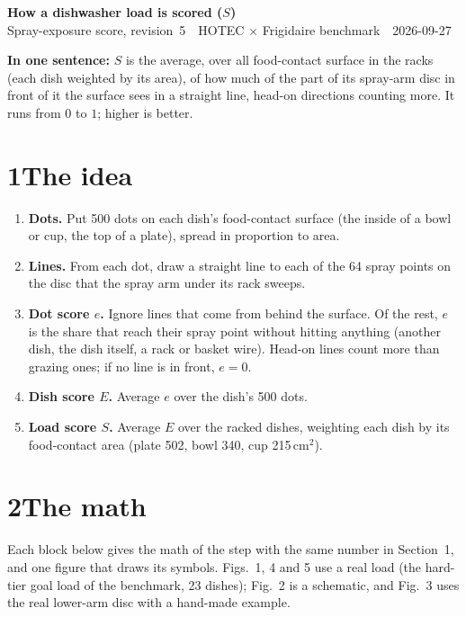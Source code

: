 \documentclass[10pt]{article}
\newif\ifpuddlerule
\begin{document}
\setlength{\abovedisplayskip}{4pt}\setlength{\belowdisplayskip}{4pt}
\setlength{\abovedisplayshortskip}{2pt}\setlength{\belowdisplayshortskip}{2pt}

{\LARGE\bfseries How a dishwasher load is scored ($S$)}\\[3pt]
{\small Spray-exposure score, revision~5 \,\textperiodcentered\, HOTEC $\times$ Frigidaire benchmark \,\textperiodcentered\, 2026-09-27}

\medskip
\textbf{In one sentence:} $S$ is the average, over all food-contact surface in the racks (each dish weighted by its area), of how much of the part of its spray-arm disc in front of it the surface sees in a straight line, head-on directions counting more.
It runs from $0$ to $1$; higher is better.

\section*{1\quad The idea}
\begin{enumerate}
\item \textbf{Dots.} Put 500 dots on each dish's food-contact surface (the inside of a bowl or cup, the top of a plate), spread in proportion to area.
\item \textbf{Lines.} From each dot, draw a straight line to each of the 64 spray points on the disc that the spray arm under its rack sweeps.
\item \textbf{Dot score $e$.} Ignore lines that come from behind the surface. Of the rest, $e$ is the share that reach their spray point without hitting anything (another dish, the dish itself, a rack or basket wire). Head-on lines count more than grazing ones; if no line is in front, $e=0$.
\item \textbf{Dish score $E$.} Average $e$ over the dish's 500 dots.
\item \textbf{Load score $S$.} Average $E$ over the racked dishes, weighting each dish by its food-contact area (plate 502, bowl 340, cup 215\,cm$^2$).
\end{enumerate}
\ifpuddlerule
A load in which any plate, bowl or cup would hold a puddle is \emph{infeasible}, whatever its $S$.
\fi

\small
\setlength{\abovedisplayskip}{3pt}\setlength{\belowdisplayskip}{3pt}
\section*{2\quad The math}
Each block below gives the math of the step with the same number in Section~1, and one figure that draws its symbols. Figs.~1, 4 and 5 use a real load (the hard-tier goal load of the benchmark, 23 dishes); Fig.~2 is a schematic, and Fig.~3 uses the real lower-arm disc with a hand-made example.
\end{document}
